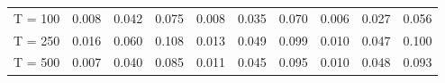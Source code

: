 % 
\begin{tabular}{cccccccccc}
  \hline
  \hline
T = 100 & 0.008 & 0.042 & 0.075 & 0.008 & 0.035 & 0.070 & 0.006 & 0.027 & 0.056 \\ 
  T = 250 & 0.016 & 0.060 & 0.108 & 0.013 & 0.049 & 0.099 & 0.010 & 0.047 & 0.100 \\ 
  T = 500 & 0.007 & 0.040 & 0.085 & 0.011 & 0.045 & 0.095 & 0.010 & 0.048 & 0.093 \\ 
   \hline
\end{tabular}
